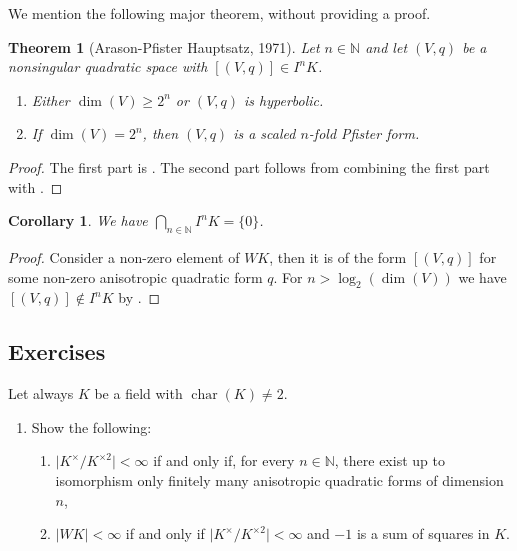 \documentclass[12pt, leqno, british]{amsart}
\theoremstyle{definition}
\theoremstyle{plain}
\newtheorem{thm}[defi]{Theorem}
\newtheorem{cor}[defi]{Corollary}
\theoremstyle{remark}
\newcommand{\mbb}{\mathbb}
\newcommand{\nat}{\mbb N}
\DeclareMathOperator{\charac}{char}
\begin{document}
We mention the following major theorem, without providing a proof.
\begin{thm}[Arason-Pfister Hauptsatz, 1971]\label{T:Arason-Pfister}
Let $n \in \nat$ and let $(V, q)$ be a nonsingular quadratic space with $[(V, q)] \in I^n K$.
\begin{enumerate}
\item Either $\dim(V) \geq 2^n$ or $(V, q)$ is hyperbolic.
\item If $\dim(V) = 2^n$, then $(V, q)$ is a scaled $n$-fold Pfister form.
\end{enumerate}
\end{thm}
\begin{proof}
The first part is \autocite[Theorem 23.7]{ElmanKarpenkoMerkurjev}.
The second part follows from combining the first part with .
\end{proof}
\begin{cor}
We have $\bigcap_{n \in \nat} I^n K = \lbrace 0 \rbrace$.
\end{cor}
\begin{proof}
Consider a non-zero element of $WK$, then it is of the form $[(V, q)]$ for some non-zero anisotropic quadratic form $q$.
For $n > \log_2(\dim(V))$ we have $[(V, q)] \not\in I^n K$ by .
\end{proof}

\subsection{Exercises}
Let always $K$ be a field with $\charac(K) \neq 2$.
\begin{enumerate}
\item Show the following:
\begin{enumerate}
\item $\lvert K^\times / K^{\times 2} \rvert < \infty$ if and only if, for every $n \in \nat$, there exist up to isomorphism only finitely many anisotropic quadratic forms of dimension $n$,
\item $\lvert WK \rvert < \infty$ if and only if $\lvert K^\times / K^{\times 2} \rvert < \infty$ and $-1$ is a sum of squares in $K$.
\end{enumerate}
\end{enumerate}
\printindex
\printbibliography
\end{document}
